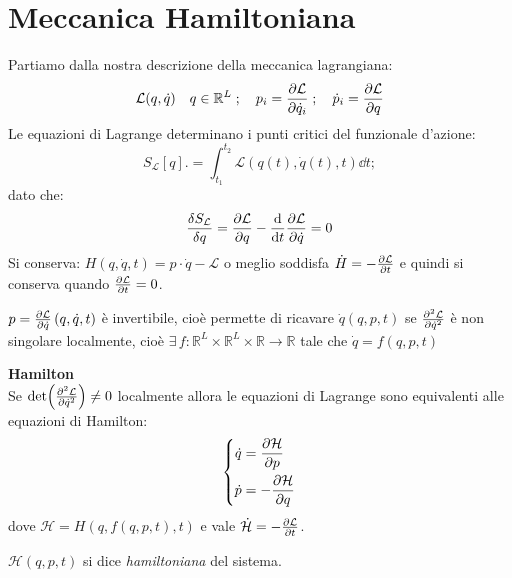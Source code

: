 \section{Meccanica Hamiltoniana}

Partiamo dalla nostra descrizione della meccanica lagrangiana:
\begin{equation}
    \mathcal{L}(q,\dot{q}) \quad q \in \mathbb{R}^L \;;\quad p_i= \pdv{\mathcal{L}}{\dot{q}_i}\;;\quad \dot{p}_i= \pdv{\mathcal{L}}{q}
\end{equation}
Le equazioni di Lagrange determinano i punti critici del funzionale d'azione:
\begin{equation}
    S_\mathcal{L}[q].= \int_{t_1}^{t_2}\mathcal{L}(q(t),\dot{q}(t),t)\dd{t};
\end{equation}
dato che:
\begin{equation}
    \frac{\delta S_\mathcal{L}}{\delta q }= \pdv{\mathcal{L}}{q}-\dv{t}\pdv{\mathcal{L}}{\dot{q}}=0
\end{equation}
Si conserva: $H(q,\dot{q},t)=p\cdot \dot{q}- \mathcal{L}$ o meglio soddisfa $\dot{H}= -\pdv{\mathcal{L}}{t}$ e quindi si conserva quando $\pdv{\mathcal{L}}{t}=0$.

\begin{remark}
    $p = \pdv{\mathcal{L}}{\dot{q}}\left(q,\dot{q},t\right)$ è invertibile, cioè permette di ricavare
     $\dot{q}(q,p,t)$ se $\pdv[2]{\mathcal{L}}{\dot{q}}$ è non singolare localmente, cioè $\exists\,f:\mathbb{R}^L \times \mathbb{R}^L \times \mathbb{R}\rightarrow \mathbb{R}$ tale che $\dot{q}= f(q, p,t)$
\end{remark}

\begin{theorem}
    \textbf{Hamilton}\\
    Se $\det(\pdv[2]{\mathcal{L}}{\dot{q}})\neq 0 $ localmente allora le equazioni di Lagrange sono 
    equivalenti alle equazioni di Hamilton:
    \begin{equation}
        \left\{
            \begin{aligned}
                \dot{q}&= \pdv{\mathcal{H}}{p}\\
                \dot{p}&= -\pdv{\mathcal{H}}{q}
            \end{aligned}
        \right.
    \end{equation}
    dove $\mathcal{H}= H(q,f(q,p,t),t)$ e vale $\dot{\mathcal{H}}= -\pdv{\mathcal{L}}{t}$.

    $\mathcal{H}(q,p,t)$ si dice \textit{hamiltoniana} del sistema.
\end{theorem}

